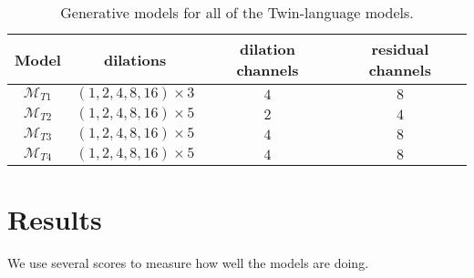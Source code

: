 \begin{table}[!htbp]
  \centering
  \begin{tabular}{|c|c|c|c|} 
    \hline
    Model & dilations & dilation channels & residual channels \\ [0.5ex] 
    \hline\hline
    $\mathcal{M}_{T1}$ & $(1, 2, 4, 8, 16) \times 3$ & $4$ & $8$ \\ 
    \hline
    $\mathcal{M}_{T2}$ & $(1, 2, 4, 8, 16) \times 5$ & $2$ & $4$ \\ 
    \hline
    $\mathcal{M}_{T3}$ & $(1, 2, 4, 8, 16) \times 5$ & $4$ & $8$ \\
    \hline
    $\mathcal{M}_{T4}$ & $(1, 2, 4, 8, 16) \times 5$ & $4$ & $8$ \\
    \hline
  \end{tabular}
  \caption{Generative models for all of the Twin-language models.}
  \label{results:Twin_lang_gen_models}
\end{table}

\FloatBarrier

\section{Results}

We use several scores to measure how well the models are doing.

